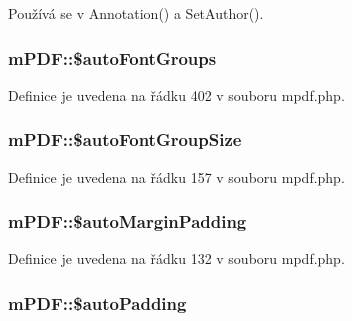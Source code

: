Používá se v Annotation() a Set\-Author().

\hypertarget{classm_p_d_f_a52a729df1c406f3879651cdf5d056a89}{
\subsubsection[{\$auto\-Font\-Groups}]{\setlength{\rightskip}{0pt plus 5cm}m\-P\-D\-F\-::\$auto\-Font\-Groups}}\label{classm_p_d_f_a52a729df1c406f3879651cdf5d056a89}


Definice je uvedena na řádku 402 v souboru mpdf.\-php.

\hypertarget{classm_p_d_f_a039d7c98f0657542a3bc0804567a6fb6}{
\subsubsection[{\$auto\-Font\-Group\-Size}]{\setlength{\rightskip}{0pt plus 5cm}m\-P\-D\-F\-::\$auto\-Font\-Group\-Size}}\label{classm_p_d_f_a039d7c98f0657542a3bc0804567a6fb6}


Definice je uvedena na řádku 157 v souboru mpdf.\-php.

\hypertarget{classm_p_d_f_a3d493ade8dd1b0a91eda777021e11185}{
\subsubsection[{\$auto\-Margin\-Padding}]{\setlength{\rightskip}{0pt plus 5cm}m\-P\-D\-F\-::\$auto\-Margin\-Padding}}\label{classm_p_d_f_a3d493ade8dd1b0a91eda777021e11185}


Definice je uvedena na řádku 132 v souboru mpdf.\-php.

\hypertarget{classm_p_d_f_a0b38b39973aaa6e04780874343323e03}{
\subsubsection[{\$auto\-Padding}]{\setlength{\rightskip}{0pt plus 5cm}m\-P\-D\-F\-::\$auto\-Padding}}\label{classm_p_d_f_a0b38b39973aaa6e04780874343323e03}


